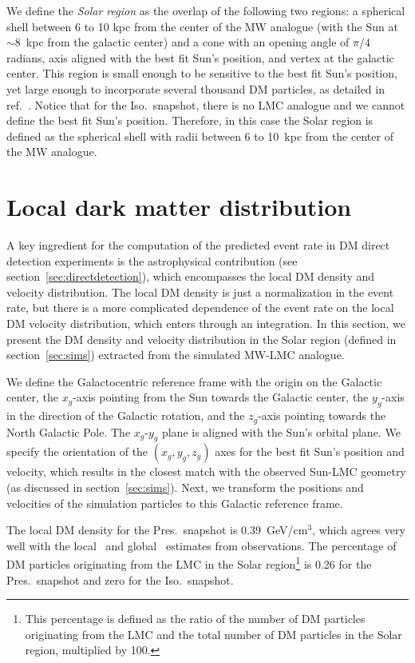 \documentclass[a4paper,11pt]{article}
\begin{document}
We define the \emph{Solar region} as the overlap of the following two regions: a spherical shell between 6 to 10 kpc from the center of the MW analogue (with the Sun at $\sim 8$~kpc from the galactic center) and a cone with an opening angle of $\pi/4$ radians, axis aligned with the best fit Sun's position, and vertex at the galactic center. This region is small enough to be sensitive to the best fit Sun's position, yet large enough to incorporate several thousand DM particles, as detailed in ref.~\cite{Smith-Orlik:2023kyl}. Notice that for the Iso.~snapshot, there is no LMC analogue and we cannot define the best fit Sun's position. Therefore, in this case the Solar region is defined as the spherical shell with radii between 6 to 10~kpc from the center of the MW analogue.


\section{Local dark matter distribution}
\label{sec:fv}

A key ingredient for the computation of the predicted event rate in DM direct detection experiments is the astrophysical contribution (see section~\ref{sec:directdetection}), which encompasses the local DM density and velocity distribution. The local DM density is just a normalization in the event rate, but there is a more complicated dependence of the event rate on the local DM velocity distribution, which enters through an integration. In this section, we present the
DM density and velocity distribution in the Solar region (defined in section~\ref{sec:sims}) extracted from the simulated MW-LMC analogue.


We define the Galactocentric reference frame with the origin on the Galactic center, the $x_g$-axis pointing from the Sun towards the Galactic center, the $y_g$-axis in the direction of the Galactic rotation, and the $z_g$-axis pointing towards the North Galactic Pole. The $x_g$-$y_g$ plane is aligned with the Sun's orbital  plane. We   specify the orientation of the $(x_g, y_g, z_g)$ axes for the best fit Sun's position and velocity, which results in the closest match with the observed Sun-LMC geometry (as discussed in section~\ref{sec:sims}). Next, we  transform the positions and velocities of the simulation particles to this Galactic reference frame.

The local DM density for the Pres.~snapshot is 0.39~{GeV/cm$^3$}, which agrees very well with the local~\cite{Salucci:2010qr, Smith:2011fs, Bovy:2012tw, Garbari:2012ff, Zhang:2012rsb, Bovy:2013raa, Posti:2019, Buch:2018qdr} and global~\cite{McMillan:2011wd, Catena:2009mf, Weber:2009pt, Iocco:2011jz, Nesti:2013uwa, Sofue:2015xpa, Pato:2015dua, deSalas:2019pee} estimates from observations. The percentage of DM particles originating from the LMC in the Solar region\footnote{This percentage is defined as the ratio of the number of DM particles originating from the LMC and the total number of DM particles in the Solar region, multiplied by 100.} is 0.26 for the Pres.~snapshot and zero for the Iso.~snapshot. 
\end{document}
